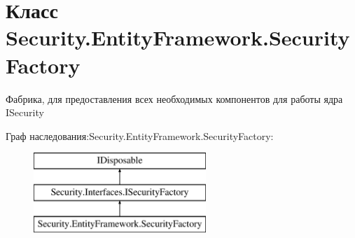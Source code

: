 \hypertarget{class_security_1_1_entity_framework_1_1_security_factory}{}\section{Класс Security.\+Entity\+Framework.\+Security\+Factory}
\label{class_security_1_1_entity_framework_1_1_security_factory}


Фабрика, для предоставления всех необходимых компонентов для работы ядра I\+Security  


Граф наследования\+:Security.\+Entity\+Framework.\+Security\+Factory\+:\begin{figure}[H]
\begin{center}
\leavevmode
\includegraphics[height=3.000000cm]{d3/dd8/class_security_1_1_entity_framework_1_1_security_factory}
\end{center}
\end{figure}
